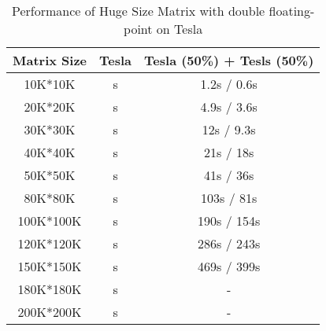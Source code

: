 \begin{table}[h]
\caption{Performance of Huge Size Matrix with double floating-point on Tesla}
\centering
\begin{tabular}{|c|c|c|}
\hline
Matrix Size &  Tesla  & Tesla (50\%) + Tesls (50\%) \\ \hline
 10K*10K    &   s  &  1.2s / 0.6s \\ \hline
 20K*20K    &   s  &  4.9s / 3.6s \\ \hline
 30K*30K    &   s  &   12s / 9.3s \\ \hline
 40K*40K    &   s  &   21s /  18s \\ \hline
 50K*50K    &   s  &   41s /  36s \\ \hline
 80K*80K    &   s  &  103s /  81s \\ \hline
 100K*100K  &   s  &  190s / 154s \\ \hline
 120K*120K  &   s  &  286s / 243s \\ \hline
 150K*150K  &   s  &  469s / 399s \\ \hline
 180K*180K  &   s  &     -  \\ \hline
 200K*200K  &   s  &     -  \\ \hline
\end{tabular}
\label{tab:hresult}
\end{table}


